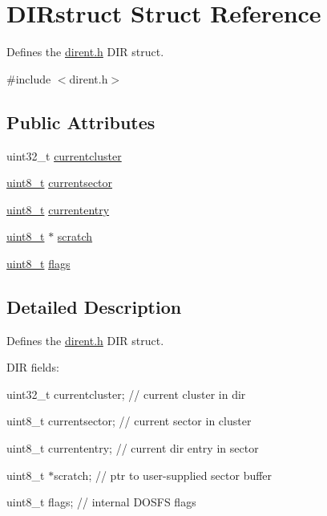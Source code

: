 \hypertarget{structDIRstruct}{}\section{D\+I\+Rstruct Struct Reference}
\label{structDIRstruct}


Defines the \mbox{\hyperlink{dirent_8h}{dirent.\+h}} D\+IR struct.  




{\ttfamily \#include $<$dirent.\+h$>$}

\subsection*{Public Attributes}
\begin{DoxyCompactItemize}
\item 
uint32\+\_\+t \mbox{\hyperlink{structDIRstruct_a9941df3697e69fbc7ccafd2c05e85775}{currentcluster}}
\item 
\mbox{\hyperlink{stdint_8h_aba7bc1797add20fe3efdf37ced1182c5}{uint8\+\_\+t}} \mbox{\hyperlink{structDIRstruct_a03b84daedd4667e6cb11981789981238}{currentsector}}
\item 
\mbox{\hyperlink{stdint_8h_aba7bc1797add20fe3efdf37ced1182c5}{uint8\+\_\+t}} \mbox{\hyperlink{structDIRstruct_a332a635460d5aa7b4c089d36544538bf}{currententry}}
\item 
\mbox{\hyperlink{stdint_8h_aba7bc1797add20fe3efdf37ced1182c5}{uint8\+\_\+t}} $\ast$ \mbox{\hyperlink{structDIRstruct_acc1294d144a7338ac671f90dc47582f6}{scratch}}
\item 
\mbox{\hyperlink{stdint_8h_aba7bc1797add20fe3efdf37ced1182c5}{uint8\+\_\+t}} \mbox{\hyperlink{structDIRstruct_ab5e42f8d70fa0bc1c1832f44fe0a84b1}{flags}}
\end{DoxyCompactItemize}


\subsection{Detailed Description}
Defines the \mbox{\hyperlink{dirent_8h}{dirent.\+h}} D\+IR struct. 

D\+IR fields\+: \begin{DoxyItemize}
\item uint32\+\_\+t currentcluster; // current cluster in dir \item uint8\+\_\+t currentsector; // current sector in cluster \item uint8\+\_\+t currententry; // current dir entry in sector \item uint8\+\_\+t $\ast$scratch; // ptr to user-\/supplied sector buffer \item uint8\+\_\+t flags; // internal D\+O\+S\+FS flags \end{DoxyItemize}


